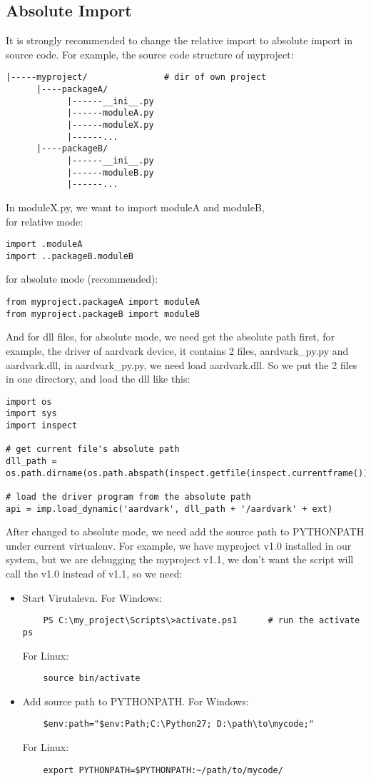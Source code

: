 \subsection{Absolute Import}
It is strongly recommended to change the relative import to absolute import in source code.
For example, the source code structure of myproject:
\begin{lstlisting}
|-----myproject/               # dir of own project 
      |----packageA/
            |------__ini__.py
            |------moduleA.py
            |------moduleX.py
            |------...
      |----packageB/
            |------__ini__.py
            |------moduleB.py
            |------...
\end{lstlisting}
In moduleX.py, we want to import moduleA and moduleB, \\
for relative mode: 
\begin{lstlisting}
import .moduleA
import ..packageB.moduleB
\end{lstlisting}
for absolute mode (recommended):
\begin{lstlisting}
from myproject.packageA import moduleA
from myproject.packageB import moduleB
\end{lstlisting}
And for dll files, for absolute mode, we need get the absolute path first, for example, the driver of aardvark device, 
it contains 2 files, aardvark\_py.py and aardvark.dll, in aardvark\_py.py, we need load aardvark.dll. So we put the 2 files in one directory, and load the dll like this:
\begin{lstlisting}
import os
import sys
import inspect

# get current file's absolute path
dll_path = os.path.dirname(os.path.abspath(inspect.getfile(inspect.currentframe())))

# load the driver program from the absolute path
api = imp.load_dynamic('aardvark', dll_path + '/aardvark' + ext)
\end{lstlisting}
After changed to absolute mode, we need add the source path to PYTHONPATH under current virtualenv. For example, we have myproject v1.0 installed in our system, 
but we are debugging the myproject v1.1, we don't want the script will call the v1.0 instead of v1.1, so we need:
\begin{itemize}
    \item
    Start Virutalevn.
    For Windows:
    \begin{lstlisting}
    PS C:\my_project\Scripts\>activate.ps1      # run the activate ps
    \end{lstlisting}
    For Linux:
    \begin{lstlisting}
    source bin/activate
    \end{lstlisting}
    \item
    Add source path to PYTHONPATH.
    For Windows:
    \begin{lstlisting}
    $env:path="$env:Path;C:\Python27; D:\path\to\mycode;"
    \end{lstlisting}
    For Linux:
    \begin{lstlisting}
    export PYTHONPATH=$PYTHONPATH:~/path/to/mycode/
    \end{lstlisting}
\end{itemize}

